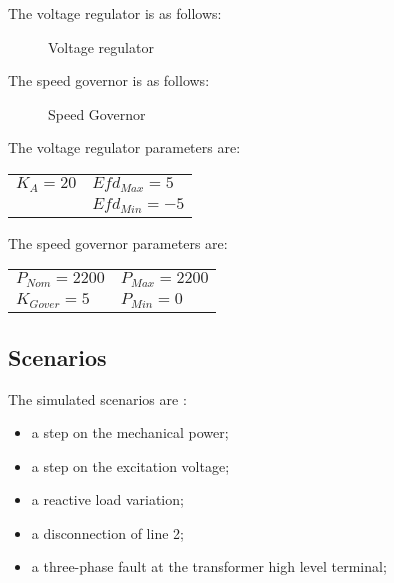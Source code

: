 \documentclass[a4paper, 12pt]{report}
\begin{document}
The voltage regulator is as follows:
\begin{figure}[H]
\centering
{}
\caption{Voltage regulator}
\end{figure}

The speed governor is as follows:
\begin{figure}[H]
\centering
{}
\caption{Speed Governor}
\end{figure}

The voltage regulator parameters are:
\begin{center}
\begin{tabular}{l|l}
   $K_A=20$ & $Efd_{Max}=5$  \\
    & $Efd_{Min}=-5$   \\
\end{tabular}
\end{center}

The speed governor parameters are:
\begin{center}
\begin{tabular}{l|l}
   $P_{Nom}=2200$ & $P_{Max}=2200$  \\
   $K_{Gover}=5$ & $P_{Min}=0$   \\
\end{tabular}
\end{center}

\subsection{Scenarios}
The simulated scenarios are :
\begin{itemize}
\item a step on the mechanical power;
\item a step on the excitation voltage;
\item a reactive load variation;
\item a disconnection of line 2;
\item a three-phase fault at the transformer high level terminal;
\end{itemize}
\end{document}
